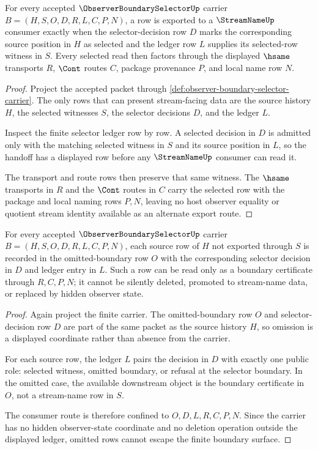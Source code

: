\begin{theorem}
\label{thm:observer-boundary-selector-selection-exactness}
For every accepted $\ObserverBoundarySelectorUp$ carrier $B=(H,S,O,D,R,L,C,P,N)$, a row is exported to a $\StreamNameUp$ consumer exactly when the selector-decision row $D$ marks the corresponding source position in $H$ as selected and the ledger row $L$ supplies its selected-row witness in $S$. Every selected read then factors through the displayed $\hsame$ transports $R$, $\Cont$ routes $C$, package provenance $P$, and local name row $N$.
\end{theorem}
\begin{proof}
Project the accepted packet through \autoref{def:observer-boundary-selector-carrier}. The only rows that can present stream-facing data are the source history $H$, the selected witnesses $S$, the selector decisions $D$, and the ledger $L$.

Inspect the finite selector ledger row by row. A selected decision in $D$ is admitted only with the matching selected witness in $S$ and its source position in $L$, so the handoff has a displayed row before any $\StreamNameUp$ consumer can read it.

The transport and route rows then preserve that same witness. The $\hsame$ transports in $R$ and the $\Cont$ routes in $C$ carry the selected row with the package and local naming rows $P,N$, leaving no host observer equality or quotient stream identity available as an alternate export route.
\end{proof}

\begin{theorem}
\label{thm:observer-boundary-selector-omission-nonescape}
For every accepted $\ObserverBoundarySelectorUp$ carrier $B=(H,S,O,D,R,L,C,P,N)$, each source row of $H$ not exported through $S$ is recorded in the omitted-boundary row $O$ with the corresponding selector decision in $D$ and ledger entry in $L$. Such a row can be read only as a boundary certificate through $R,C,P,N$; it cannot be silently deleted, promoted to stream-name data, or replaced by hidden observer state.
\end{theorem}
\begin{proof}
Again project the finite carrier. The omitted-boundary row $O$ and selector-decision row $D$ are part of the same packet as the source history $H$, so omission is a displayed coordinate rather than absence from the carrier.

For each source row, the ledger $L$ pairs the decision in $D$ with exactly one public role: selected witness, omitted boundary, or refusal at the selector boundary. In the omitted case, the available downstream object is the boundary certificate in $O$, not a stream-name row in $S$.

The consumer route is therefore confined to $O,D,L,R,C,P,N$. Since the carrier has no hidden observer-state coordinate and no deletion operation outside the displayed ledger, omitted rows cannot escape the finite boundary surface.
\end{proof}

